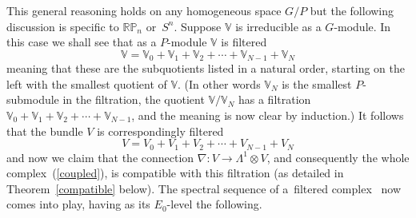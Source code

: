 \documentclass[11pt]{article}
\begin{document}
This general reasoning holds on any homogeneous space $G/P$ but the following
discussion is specif\/ic to ${\mathbb{RP}}_n$ or~$S^n$. Suppose ${\mathbb{V}}$ is
irreducible as a $G$-module. In this case we shall see that as a $P$-module
${\mathbb{V}}$ is f\/iltered
\begin{equation}\label{filtration}
{\mathbb{V}}={\mathbb{V}}_0+{\mathbb{V}}_1+{\mathbb{V}}_2+
\cdots+{\mathbb{V}}_{N-1}+{\mathbb{V}}_N\end{equation} meaning that
these are the subquotients listed in a natural order, starting on the
left with the smallest quotient of $\mathbb{V}$.  (In other words
${\mathbb{V}}_N$ is the smallest $P$-submodule in the f\/iltration, the
quotient ${\mathbb{V}}/{\mathbb{V}}_N$ has a f\/iltration
${\mathbb{V}}_0+{\mathbb{V}}_1+{\mathbb{V}}_2+
\cdots+{\mathbb{V}}_{N-1}$, and the meaning is now clear by induction.)
It follows that the bundle $V$ is correspondingly f\/iltered
\begin{equation}\label{correspondingfiltration}
V=V_0+V_1+V_2+\cdots+V_{N-1}+V_N\end{equation}
and now we claim that the connection $\nabla:V\to\Lambda^1\otimes V$, and
consequently the whole complex~(\ref{coupled}), is compatible with this
f\/iltration (as detailed in Theorem~\ref{compatible} below). The spectral
sequence of a~f\/iltered complex~\cite{c} now comes into play, having as its
$E_0$-level the following.
\end{document}
